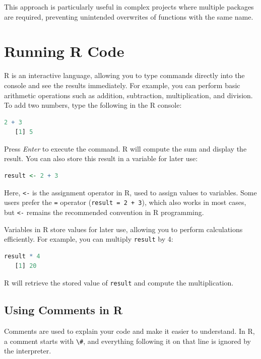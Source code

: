 \documentclass[
]{book}
\newcommand{\passthrough}[1]{#1}
\theoremstyle{definition}
\theoremstyle{definition}
\theoremstyle{definition}
\theoremstyle{definition}
\theoremstyle{remark}
\begin{document}
This approach is particularly useful in complex projects where multiple packages are required, preventing unintended overwrites of functions with the same name.

\section{Running R Code}\label{running-r-code}

R is an interactive language, allowing you to type commands directly into the console and see the results immediately. For example, you can perform basic arithmetic operations such as addition, subtraction, multiplication, and division. To add two numbers, type the following in the R console:

\begin{lstlisting}[language=R]
2 + 3
   [1] 5
\end{lstlisting}

Press \emph{Enter} to execute the command. R will compute the sum and display the result. You can also store this result in a variable for later use:

\begin{lstlisting}[language=R]
result <- 2 + 3
\end{lstlisting}

Here, \passthrough{\lstinline!<-!} is the assignment operator in R, used to assign values to variables. Some users prefer the \passthrough{\lstinline!=!} operator (\passthrough{\lstinline!result = 2 + 3!}), which also works in most cases, but \passthrough{\lstinline!<-!} remains the recommended convention in R programming.

Variables in R store values for later use, allowing you to perform calculations efficiently. For example, you can multiply \passthrough{\lstinline!result!} by 4:

\begin{lstlisting}[language=R]
result * 4
   [1] 20
\end{lstlisting}

R will retrieve the stored value of \passthrough{\lstinline!result!} and compute the multiplication.

\subsection*{Using Comments in R}\label{using-comments-in-r}

Comments are used to explain your code and make it easier to understand. In R, a comment starts with \passthrough{\lstinline!\#!}, and everything following it on that line is ignored by the interpreter.
\end{document}
